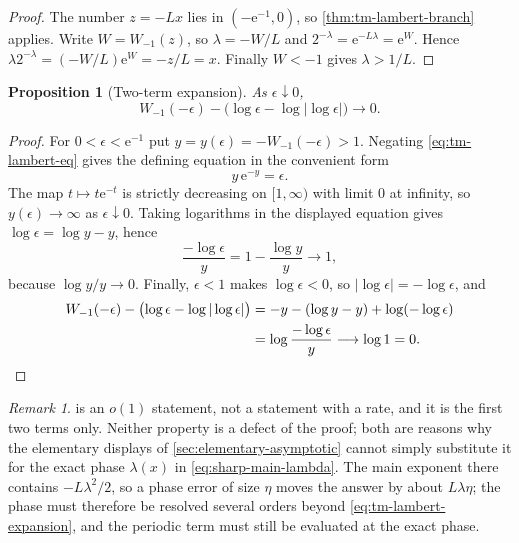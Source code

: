 \documentclass[11pt,oneside]{article}
\newtheorem{proposition}[theorem]{Proposition}
\theoremstyle{definition}
\theoremstyle{remark}
\newtheorem{remark}[theorem]{Remark}
\newcommand{\e}{\mathrm e}
\newcommand{\smallo}{o}
\begin{document}
\begin{proof}
The number $z=-Lx$ lies in $(-\e^{-1},0)$, so \cref{thm:tm-lambert-branch} applies.  Write
$W=W_{-1}(z)$, so $\lambda=-W/L$ and $2^{-\lambda}=\e^{-L\lambda}=\e^{W}$.  Hence
$\lambda2^{-\lambda}=(-W/L)\e^{W}=-z/L=x$.  Finally $W<-1$ gives $\lambda>1/L$.
\end{proof}

\begin{proposition}[Two-term expansion]
\label{thm:tm-lambert-expansion}
As $\epsilon\downarrow0$,
\begin{equation}
 W_{-1}(-\epsilon)-\bigl(\log\epsilon-\log|\log\epsilon|\bigr)\longrightarrow0.
                                                          \label{eq:tm-lambert-expansion}
\end{equation}
\end{proposition}

\begin{proof}
For $0<\epsilon<\e^{-1}$ put $y=y(\epsilon)=-W_{-1}(-\epsilon)>1$.  Negating
\eqref{eq:tm-lambert-eq} gives the defining equation in the convenient form
\begin{equation*}
 y\,\e^{-y}=\epsilon .
\end{equation*}
The map $t\mapsto t\e^{-t}$ is strictly decreasing on $[1,\infty)$ with limit $0$ at
infinity, so $y(\epsilon)\to\infty$ as $\epsilon\downarrow0$.  Taking logarithms in the
displayed equation gives $\log\epsilon=\log y-y$, hence
\begin{equation*}
 \frac{-\log\epsilon}{y}=1-\frac{\log y}{y}\longrightarrow1,
\end{equation*}
because $\log y/y\to0$.  Finally, $\epsilon<1$ makes $\log\epsilon<0$, so
$|\log\epsilon|=-\log\epsilon$, and
\begin{align*}
 W_{-1}(-\epsilon)-\bigl(\log\epsilon-\log|\log\epsilon|\bigr)
 &=-y-(\log y-y)+\log(-\log\epsilon)\\
 &=\log\frac{-\log\epsilon}{y}\longrightarrow\log1=0. \qedhere
\end{align*}
\end{proof}

\begin{remark}
 is an $\smallo(1)$ statement, not a statement with a rate,
and it is the first two terms only.  Neither property is a defect of the proof; both are
reasons why the elementary displays of \cref{sec:elementary-asymptotic} cannot simply
substitute it for the exact phase $\lambda(x)$ in \eqref{eq:sharp-main-lambda}.  The main
exponent there contains $-L\lambda^2/2$, so a phase error of size $\eta$ moves the answer by
about $L\lambda\eta$; the phase must therefore be resolved several orders beyond
\eqref{eq:tm-lambert-expansion}, and the periodic term must still be evaluated at the exact
phase.
\end{remark}
\end{document}
